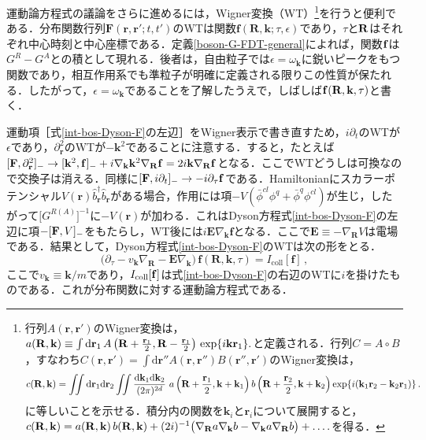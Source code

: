 \documentclass[a4paper,11pt]{ltjsarticle}
\def\d{\mathrm{d}}
\begin{document}
運動論方程式の議論をさらに進めるには，Wigner変換（WT）\footnote{行列$A(\mathbf{r},\mathbf{r}')$のWigner変換は，$
a(\mathbf{R},\mathbf{k})\equiv\int\d \mathbf{r}_1  \,
A\left(\mathbf{R}+{\mathbf{r}_1\over 2},
\mathbf{R}-{\mathbf{r}_1\over 2}\right)\,\exp\{i\mathbf{kr}_1\}.$と定義される．行列$C=A\circ B$，すなわち$C(\mathbf{r},\mathbf{r}')=\int\d\mathbf{r}''
A(\mathbf{r},\mathbf{r}'')B(\mathbf{r}'',\mathbf{r}')$のWigner変換は，$$
c(\mathbf{R},\mathbf{k})=\iint\d\mathbf{r}_1\d\mathbf{r}_2 \iint{\d
\mathbf{k}_1\d\mathbf{k}_2\over (2\pi)^{2d}}\,\,
a\left(\mathbf{R}+{\mathbf{r}_1\over
2},\mathbf{k}+\mathbf{k}_1\right)
b\left(\mathbf{R}+{\mathbf{r}_2\over
2},\mathbf{k}+\mathbf{k}_2\right)
\exp\{i(\mathbf{k}_1\mathbf{r}_2-\mathbf{k}_2\mathbf{r}_1)\}\,.
$$に等しいことを示せる．積分内の関数を$\mathbf{k}_i$と$\mathbf{r}_i$について展開すると，$c(\mathbf{R},\mathbf{k})=
a(\mathbf{R},\mathbf{k})\,b(\mathbf{R},\mathbf{k})+(2i)^{-1}\big(\nabla_{\bf{R}}
a\nabla_\mathbf{k} b - \nabla_\mathbf{k} a\nabla_{\bf{R}} b\big)
+\ldots.$を得る．}を行うと便利である．分布関数行列$\mathbf
{F}(\mathbf{r},\mathbf{r}';t,t')$のWTは関数$\mathbf{f}(\mathbf{R},\mathbf{k};\tau,\epsilon)$であり，$\tau$と$\bf{R}$はそれぞれ中心時刻と中心座標である．定義\eqref{boson-G-FDT-general}によれば，関数${\bf f}$は$G^R-G^A$との積として現れる．後者は，自由粒子では$\epsilon=\omega_\mathbf{k}$に鋭いピークをもつ関数であり，相互作用系でも準粒子が明確に定義される限りこの性質が保たれる．したがって，$\epsilon=\omega_\mathbf{k}$であることを了解したうえで，しばしば${\bf f}(\bf{R},\mathbf{k},\tau)$と書く．


運動項［式\eqref{int-bos-Dyson-F}の左辺］をWigner表示で書き直すため，$i\partial_t$のWTが$\epsilon$であり，$\partial^2_\mathbf{r}$のWTが$-\mathbf{k}^2$であることに注意する．すると，たとえば$[{\bf
F},\partial_\mathbf{r}^2]_-\to [\mathbf{k}^2,\mathbf{f}]_-
+i\nabla_\mathbf{k} \mathbf{k}^2\nabla_{\mathbf{R}}
\mathbf{f}=2i\mathbf{k}\nabla_{\mathbf{R}}\mathbf{f}$となる．ここでWTどうしは可換なので交換子は消える．同様に$[{\bf
F},i\partial_t]_-\to -i\partial_\tau {\bf f}$である．Hamiltonianにスカラーポテンシャル$V(\mathbf{r})\hat{b}^\dagger_\mathbf{r}\hat{b}_\mathbf{r}$がある場合，作用には項$-V(\bar\phi^{cl}\phi^{q}+\bar\phi^{q}\phi^{cl})$が生じ，したがって$\big[G^{R(A)}\big]^{-1}$に$-V(\mathbf{r})$が加わる．これはDyson方程式\eqref{int-bos-Dyson-F}の左辺に項$-[{\bf F},V]_-$をもたらし，WT後には$i\mathbf{E}\nabla_\mathbf{k}{\mathbf{f}}$となる．ここで$\mathbf{E}\equiv-\nabla_{\mathbf{R}} V$は電場である．結果として，Dyson方程式\eqref{int-bos-Dyson-F}のWTは次の形をとる．
\begin{equation}\label{int-bos-kinetic-eq}
\Big(\partial_\tau-v_\mathbf{k}\nabla_{\mathbf{R}} -
\mathbf{E}\nabla_\mathbf{k}\Big)\,\mathbf{f}(\mathbf{R},\mathbf{k},\tau)
= I_{\mathrm{coll}}[\mathbf{f}]\, ,
\end{equation}ここで$v_\mathbf{k}\equiv \mathbf{k}/m$であり，$I_{\mathrm{coll}}[{\bf
f}]$は式\eqref{int-bos-Dyson-F}の右辺のWTに$i$を掛けたものである．これが分布関数に対する運動論方程式である．
\end{document}

